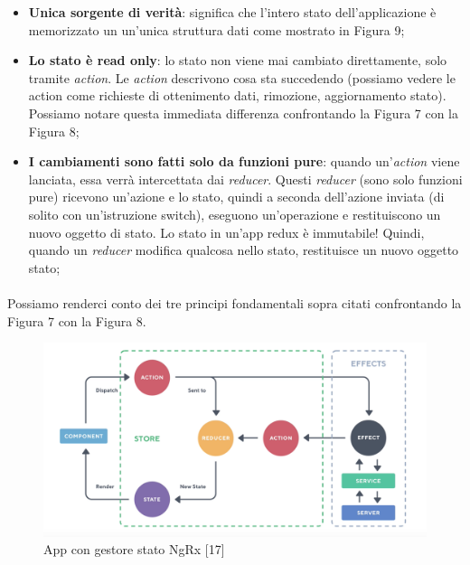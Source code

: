 \begin{itemize}
    \item \textbf{Unica sorgente di verità}: significa che l'intero stato dell'applicazione è memorizzato un un'unica struttura dati come mostrato in Figura 9;
    \item \textbf{Lo stato è read only}: lo stato non viene mai cambiato direttamente, 
    solo tramite \textit{action}. Le \textit{action} descrivono cosa sta succedendo (possiamo vedere le action
    come richieste di ottenimento dati, rimozione, aggiornamento stato). Possiamo notare questa immediata differenza confrontando la Figura 7 con la Figura 8;
    \item \textbf{I cambiamenti sono fatti solo da funzioni pure}: quando un'\textit{action} viene lanciata, essa verrà
    intercettata dai \textit{reducer}.
    Questi \textit{reducer} (sono solo funzioni pure) ricevono un'azione e lo stato, quindi a seconda dell'azione inviata 
    (di solito con un'istruzione switch), eseguono un'operazione e restituiscono un nuovo oggetto di stato. 
    Lo stato in un'app redux è immutabile! Quindi, quando un \textit{reducer} modifica qualcosa nello stato, 
    restituisce un nuovo oggetto stato;
\end{itemize}

\paragraph{}
Possiamo renderci conto dei tre principi fondamentali sopra citati confrontando la Figura 7 con la Figura 8.

\begin{figure}[h!]
    \centering  
    \caption{App con gestore stato NgRx [17]}
    \includegraphics[scale=0.4]{img/cap2/ngrx}
\end{figure}
\paragraph{}

